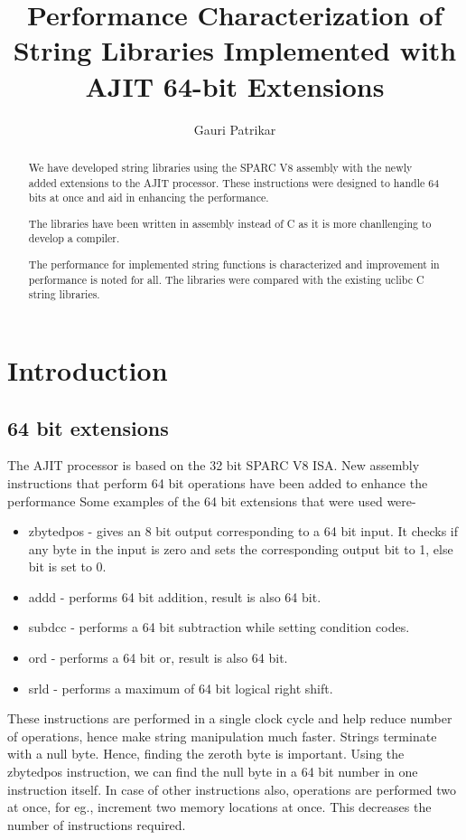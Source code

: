 \documentclass[12pt]{article}
\title{\textbf{Performance  Characterization of String Libraries Implemented with AJIT 64-bit Extensions}}
\author[1]{Gauri Patrikar}
\affil[1]{Project Research Assistant, IITB}
\begin{document}
\maketitle
\begin{abstract}

We have developed string libraries using the SPARC V8 assembly with the newly added extensions to the AJIT processor. These instructions were designed to handle 64 bits at once and aid in enhancing the performance. 


The libraries have been written in assembly instead of C as it is more chanllenging to develop a compiler.


The performance for implemented string functions is characterized and improvement in performance is noted for all. 
The libraries were compared with the existing uclibc C string libraries.
 \end{abstract}

\section{Introduction}
\subsection{64 bit extensions}
The AJIT processor is based on the 32 bit SPARC V8 ISA.  New assembly instructions that perform 64 bit operations have been added to enhance the performance
Some  examples of the 64 bit extensions that were used were-
\begin{itemize}
    \item zbytedpos - gives an 8 bit output corresponding to a 64 bit input. It checks if any byte in the input is zero and sets the corresponding output bit to 1, else bit is set to 0.
    \item addd - performs 64 bit addition, result is also 64 bit.
    \item subdcc - performs a 64 bit subtraction while setting condition codes.
    \item ord - performs a 64 bit or, result is also 64 bit.
    \item srld  - performs a maximum of 64 bit logical right shift.
\end{itemize}

These instructions are performed in a single clock cycle and  help reduce number of operations, hence make string manipulation much faster.\newline
Strings terminate with a null byte. Hence, finding the zeroth byte is important. Using the zbytedpos instruction, we can find the null byte in a 64 bit number in one instruction itself. In case of other instructions also, operations are performed two at once, for eg., increment two memory locations at once. This decreases the number of instructions required. 
\end{document}
